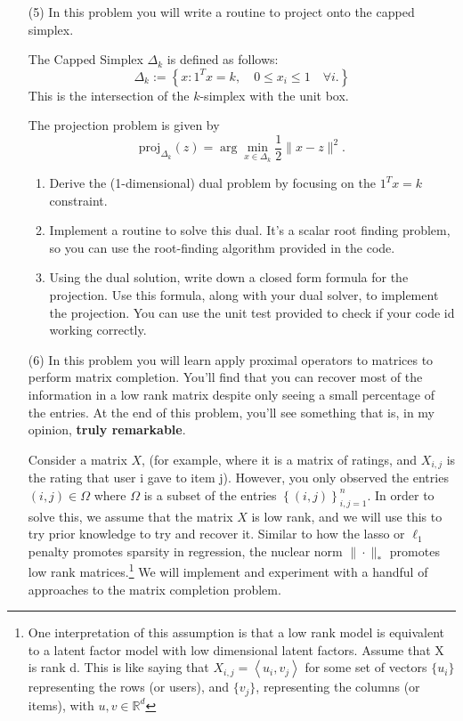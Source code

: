 \documentclass[11pt]{amsart}
\begin{document}
\vskip 16pt
\begin{enumerate}
\item[(5)] In this problem you will write a routine to project onto the capped simplex. 

The Capped Simplex $\Delta_k$ is defined as follows: 
\[
\Delta_k := \left\{x: 1^Tx = k, \quad 0 \leq x_i \leq 1 \quad \forall i. \right\}
\]
This is the intersection of the $k$-simplex with the unit box. 

The projection problem is given by 
\[
\mbox{proj}_{\Delta_k}(z) = \arg\min_{x \in \Delta_k} \frac{1}{2}\|x-z\|^2.
\]
\begin{enumerate}
\item Derive the (1-dimensional) dual problem by focusing on the $1^Tx = k$ constraint. 
\bigskip \bigskip
\item Implement a routine to solve this dual. It's a scalar root finding problem, 
so you can use the root-finding algorithm provided in the code.  
\bigskip \bigskip
\item Using the dual solution, write down a closed form formula for the projection.  
Use this formula, along with your dual solver, to implement the projection. You can use the unit test 
provided to check if your code id working correctly. 

\end{enumerate}

\item[(6)] In this problem you will learn apply proximal operators to matrices to perform matrix completion. You'll find that you can recover most of the information in a low rank matrix despite only seeing a small percentage of the entries. At the end of this problem, you'll see something that is, in my opinion, \textbf{truly remarkable}.

Consider a matrix $X$, (for example, where it is a matrix of ratings, and $X_{i,j}$ is the rating that user i gave to item j). However, you only observed the entries $(i,j)\in \Omega$ where $\Omega$ is a subset of the entries $\left\{(i,j) \right\}_{i,j=1}^n$. In order to solve this, we assume that the matrix $X$ is low rank, and we will use this to try prior knowledge to try and recover it. Similar to how the lasso or $\ell_1$ penalty promotes sparsity in regression, the nuclear norm $\| \cdot \|_*$ promotes low rank matrices.\footnote{One interpretation of this assumption is that a low rank model is equivalent to a latent factor model with low dimensional latent factors. Assume that X is rank d. This is like saying that $X_{i,j}=\left<u_i,v_j\right>$ for some set of vectors $\{u_i\}$ representing the rows (or users), and $\{v_j\}$, representing the columns (or items), with $u,v\in \mathbb{R}^d$} We will implement and experiment with a handful of approaches to the matrix completion problem. 


\end{enumerate}
\end{document}
